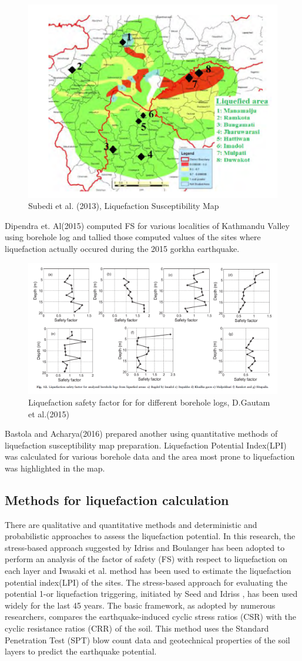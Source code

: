 \begin{figure}[!hbt]
\centering
\includegraphics[width=0.5\linewidth,keepaspectratio]{images/main/dipendra.png}
\caption{Subedi et al. (2013), Liquefaction Susceptibility Map}
\end{figure}

Dipendra et. Al(2015)\cite{r30} computed FS for various localities of Kathmandu Valley using borehole log and tallied those computed values of the sites where liquefaction actually occured during the 2015 gorkha earthquake.

\begin{figure}[!hbt]
\centering
\includegraphics[width=0.5\linewidth,keepaspectratio]{images/main/bastola_acharya.png}
\caption{Liquefaction safety factor for for different borehole logs, D.Gautam et al.(2015)}
\end{figure}

Bastola and Acharya(2016)\cite{r31} prepared another using quantitative methods of  liquefaction susceptibility map preparation. Liquefaction Potential Index(LPI) was calculated for various borehole data and the area most prone to liquefaction was highlighted in the map. 

\subsection{Methods for liquefaction calculation}
There are qualitative and quantitative methods and deterministic and probabilistic approaches to assess the liquefaction potential. In this research, the stress-based approach suggested by Idriss and Boulanger\cite{idris_and_bolinger} has been adopted to perform an analysis of the factor of safety (FS) with respect to liquefaction on each layer and Iwasaki et al. \cite{r26} method has been used to estimate the liquefaction potential index(LPI) of the sites.
The stress-based approach for evaluating the potential 1-or liquefaction triggering, initiated by Seed and Idriss \cite{idris_seed}, has been used widely for the last 45 years. The basic framework, as adopted by numerous researchers, compares the earthquake-induced cyclic stress ratios (CSR) with the cyclic resistance ratios (CRR) of the soil. This method uses the Standard Penetration Test (SPT) blow count data and geotechnical properties of the soil layers to predict the earthquake potential.
